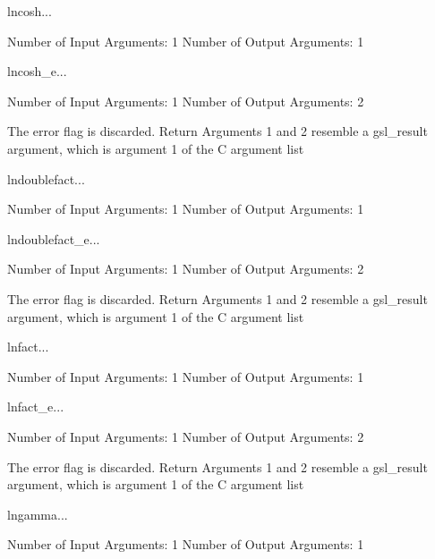 \begin{funcdesc}{lncosh}{...}

    Number of Input  Arguments:  1
    Number of Output Arguments:  1
\end{funcdesc}

\begin{funcdesc}{lncosh_e}{...}

    Number of Input  Arguments:  1
    Number of Output Arguments:  2

The error flag is discarded.
Return Arguments 1 and 2 resemble a gsl_result argument,
	which is  argument 1 of the C argument list

\end{funcdesc}

\begin{funcdesc}{lndoublefact}{...}

    Number of Input  Arguments:  1
    Number of Output Arguments:  1
\end{funcdesc}

\begin{funcdesc}{lndoublefact_e}{...}

    Number of Input  Arguments:  1
    Number of Output Arguments:  2

The error flag is discarded.
Return Arguments 1 and 2 resemble a gsl_result argument,
	which is  argument 1 of the C argument list

\end{funcdesc}

\begin{funcdesc}{lnfact}{...}

    Number of Input  Arguments:  1
    Number of Output Arguments:  1
\end{funcdesc}

\begin{funcdesc}{lnfact_e}{...}

    Number of Input  Arguments:  1
    Number of Output Arguments:  2

The error flag is discarded.
Return Arguments 1 and 2 resemble a gsl_result argument,
	which is  argument 1 of the C argument list

\end{funcdesc}

\begin{funcdesc}{lngamma}{...}

    Number of Input  Arguments:  1
    Number of Output Arguments:  1
\end{funcdesc}


